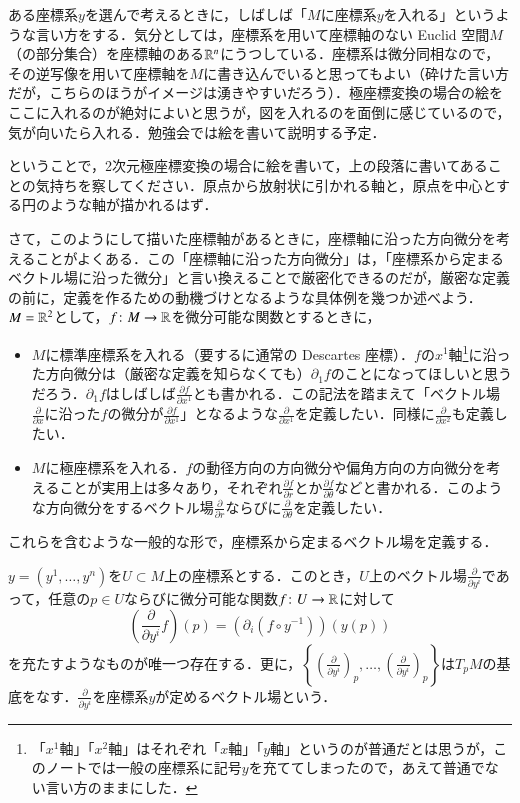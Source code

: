 ある座標系$y$を選んで考えるときに，しばしば「$M$に座標系$y$を入れる」というような言い方をする．気分としては，座標系を用いて座標軸のない Euclid 空間$M$（の部分集合）を座標軸のある$\mathbb{R}^n$にうつしている．座標系は微分同相なので，その逆写像を用いて座標軸を$M$に書き込んでいると思ってもよい（砕けた言い方だが，こちらのほうがイメージは湧きやすいだろう）．極座標変換の場合の絵をここに入れるのが絶対によいと思うが，図を入れるのを面倒に感じているので，気が向いたら入れる．勉強会では絵を書いて説明する予定．

\begin{que}
ということで，2次元極座標変換の場合に絵を書いて，上の段落に書いてあることの気持ちを察してください．原点から放射状に引かれる軸と，原点を中心とする円のような軸が描かれるはず．
\end{que}

さて，このようにして描いた座標軸があるときに，座標軸に沿った方向微分を考えることがよくある．この「座標軸に沿った方向微分」は，「座標系から定まるベクトル場に沿った微分」と言い換えることで厳密化できるのだが，厳密な定義の前に，定義を作るための動機づけとなるような具体例を幾つか述べよう．$M=\mathbb{R}^2$として，$f \colon M \to \mathbb{R}$を微分可能な関数とするときに，
\begin{itemize}
\item $M$に標準座標系を入れる（要するに通常の Descartes 座標）．$f$の$x^1$軸\footnote{「$x^1$軸」「$x^2$軸」はそれぞれ「$x$軸」「$y$軸」というのが普通だとは思うが，このノートでは一般の座標系に記号$y$を充ててしまったので，あえて普通でない言い方のままにした．}に沿った方向微分は（厳密な定義を知らなくても）$\partial_1 f$のことになってほしいと思うだろう．$\partial_1 f$はしばしば$\frac{\partial f}{\partial x^1}$とも書かれる．この記法を踏まえて「ベクトル場$\frac{\partial}{\partial x}$に沿った$f$の微分が$\frac{\partial f}{\partial x^1}$」となるような$\frac{\partial}{\partial x^1}$を定義したい．同様に$\frac{\partial}{\partial x^2}$も定義したい．
\item $M$に極座標系を入れる．$f$の動径方向の方向微分や偏角方向の方向微分を考えることが実用上は多々あり，それぞれ$\frac{\partial f}{\partial r}$とか$\frac{\partial f}{\partial \theta}$などと書かれる．このような方向微分をするベクトル場$\frac{\partial}{\partial r}$ならびに$\frac{\partial}{\partial \theta}$を定義したい．
\end{itemize}
これらを含むような一般的な形で，座標系から定まるベクトル場を定義する．
\begin{prop}
$y=(y^1, \dots, y^n)$を$U \subset M$上の座標系とする．このとき，$U$上のベクトル場$\frac{\partial}{\partial y^i}$であって，任意の$p \in U$ならびに微分可能な関数$f \colon U \to \mathbb{R}$に対して
\begin{equation}
\left( \frac{\partial}{\partial y^i} f \right)(p) = \left(\partial_i (f \circ y^{-1}) \right) (y(p))
\end{equation}を充たすようなものが唯一つ存在する．更に，$\left\{ \left(\frac{\partial}{\partial y^i}\right)_p,\dots, \left(\frac{\partial}{\partial y^i}\right)_p \right\}$は$T_pM$の基底をなす．$\frac{\partial}{\partial y^i}$を座標系$y$が定めるベクトル場という．
\end{prop}

